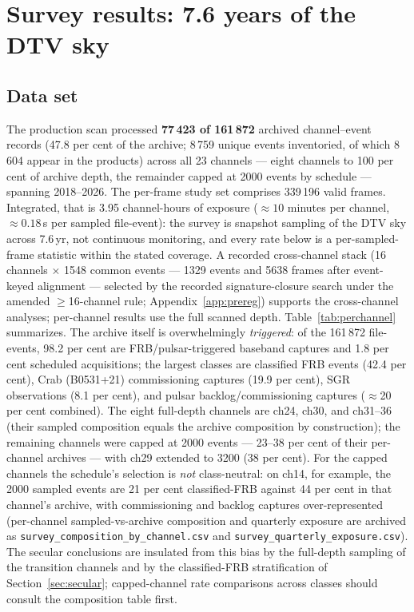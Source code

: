\section{Survey results: 7.6 years of the DTV sky}
\label{sec:survey}

\subsection{Data set}

The production scan processed \textbf{77\,423 of 161\,872} archived
channel--event records (47.8 per cent of the archive; 8\,759 unique
events inventoried, of which 8\,604 appear in the products) across all 23 channels
--- eight channels to 100 per cent of archive depth, the remainder capped
at 2000 events by schedule --- spanning 2018--2026. The per-frame study set
comprises 339\,196 valid frames. Integrated, that is 3.95 channel-hours of
exposure ($\approx 10$ minutes per channel, $\approx 0.18$\,s per sampled
file-event): the survey is snapshot sampling of the DTV sky across
7.6\,yr, not continuous monitoring, and every rate below is a
per-sampled-frame statistic within the stated coverage. A recorded
cross-channel stack (16 channels $\times$ 1548 common events --- 1329
events and 5638 frames after event-keyed alignment --- selected by the
recorded signature-closure search under the amended $\ge$16-channel
rule; Appendix~\ref{app:prereg}) supports the cross-channel analyses;
per-channel results use the full scanned depth.
Table~\ref{tab:perchannel} summarizes.
The archive itself is overwhelmingly \emph{triggered}: of the 161\,872
file-events, 98.2 per cent are FRB/pulsar-triggered baseband captures
and 1.8 per cent scheduled acquisitions; the largest classes are
classified FRB events (42.4 per cent), Crab (B0531+21) commissioning
captures (19.9 per cent), SGR observations (8.1 per cent), and pulsar
backlog/commissioning captures ($\approx$20 per cent combined). The
eight full-depth channels are ch24, ch30, and ch31--36 (their sampled
composition equals the archive composition by construction); the
remaining channels were capped at 2000 events --- 23--38 per cent of
their per-channel archives --- with ch29 extended to 3200 (38 per cent).
For the capped channels the schedule's selection is \emph{not}
class-neutral: on ch14, for example, the 2000 sampled events are 21 per
cent classified-FRB against 44 per cent in that channel's archive, with
commissioning and backlog captures over-represented (per-channel
sampled-vs-archive composition and quarterly exposure are archived as
\texttt{survey\_composition\_by\_channel.csv} and
\texttt{survey\_quarterly\_exposure.csv}). The secular conclusions are
insulated from this bias by the full-depth sampling of the transition
channels and by the classified-FRB stratification of
Section~\ref{sec:secular}; capped-channel rate comparisons across
classes should consult the composition table first.

